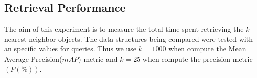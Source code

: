 \documentclass{article}
\begin{document}
 




\subsection{Retrieval Performance} %
 The aim of this experiment is to measure the total time   spent  retrieving the $k$-nearest neighbor objects. The data structures being compared were tested with an specific values for queries. Thus we use   $k=1000$   when compute the Mean Average Precision($mAP$) metric and $k=25$ when compute the  precision metric $(P (\%))$.
\end{document}
